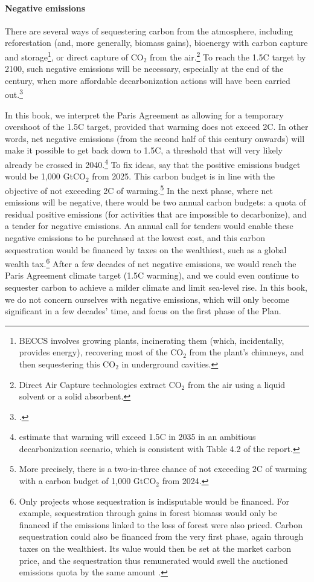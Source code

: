 \documentclass[a5paper,english,openany]{memoir}
\begin{document}
\paragraph{Negative emissions}
There are several ways of sequestering carbon from the atmosphere, including reforestation (and, more generally, biomass gains), bioenergy with carbon capture and storage\footnote{BECCS involves growing plants, incinerating them (which, incidentally, provides energy), recovering most of the CO$_\text{2}$ from the plant's chimneys, and then sequestering this CO$_\text{2}$ in underground cavities.}, or direct capture of CO$_\text{2}$ from the air.\footnote{Direct Air Capture technologies extract CO$_\text{2}$ from the air using a liquid solvent or a solid absorbent.} 
To reach the 1.5\textdegree{}C target by 2100, such negative emissions will be necessary, especially at the end of the century, when more affordable decarbonization actions will have been carried out.\footnote{\citet{minx_negative_2018}.} 

In this book, we interpret the Paris Agreement as allowing for a temporary overshoot of the 1.5\textdegree{}C target, provided that warming does not exceed 2\textdegree{}C. In other words, net negative emissions (from the second half of this century onwards) will make it possible to get back down to 1.5\textdegree{}C, a threshold that will very likely already be crossed in 2040.\footnote{\citet{diffenbaugh_data-driven_2023} estimate that warming will exceed 1.5\textdegree{}C in 2035 in an ambitious decarbonization scenario, which is consistent with Table 4.2 of the \citet{ipcc_climate_2021} report.} 
To fix ideas, say that the positive emissions budget would be 1,000 GtCO$_\text{2}$ from 2025. This carbon budget is in line with the objective of not exceeding 2\textdegree{}C of warming.\footnote{More precisely, there is a two-in-three chance of not exceeding 2\textdegree{}C of warming with a carbon budget of 1,000 GtCO$_\text{2}$ from 2024.} 
In the next phase, where net emissions will be negative, there would be two annual carbon budgets: a quota of residual positive emissions (for activities that are impossible to decarbonize), and a tender for negative emissions. An annual call for tenders would enable these negative emissions to be purchased at the lowest cost, and this carbon sequestration would be financed by taxes on the wealthiest, such as a global wealth tax.\footnote{Only projects whose sequestration is indisputable would be financed. For example, sequestration through gains in forest biomass would only be financed if the emissions linked to the loss of forest were also priced. Carbon sequestration could also be financed from the very first phase, again through taxes on the wealthiest. Its value would then be set at the market carbon price, and the sequestration thus remunerated would swell the auctioned emissions quota by the same amount \citep{edenhofer_governance_2023}.} %
After a few decades of net negative emissions, we would reach the Paris Agreement climate target (1.5\textdegree{}C warming), and we could even continue to sequester carbon to achieve a milder climate and limit sea-level rise. In this book, we do not concern ourselves with negative emissions, which will only become significant in a few decades' time, and focus on the first phase of the Plan. 
\end{document}

